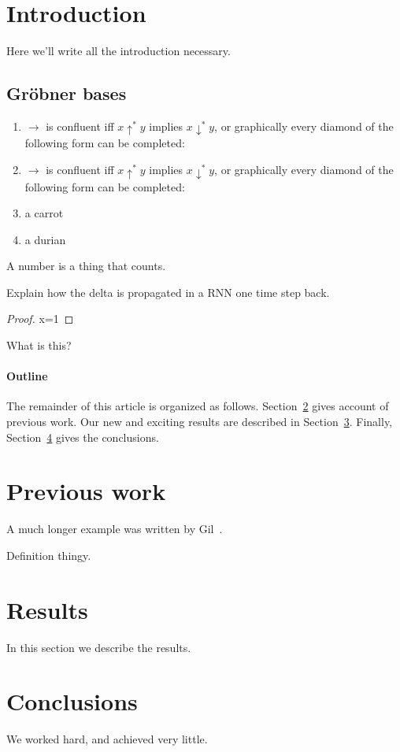\section{Introduction}
Here we'll write all the introduction necessary.

\subsection{Gr{\"o}bner bases}

\begin{definition} \leavevmode
	\begin{enumerate}[label=(\alph*)]
		\item $\rightarrow$ is confluent iff $x \uparrow^* y$ implies $x \downarrow^* y$, or graphically every diamond of the following form can be completed:
		\item $\rightarrow$ is confluent iff $x \uparrow^* y$ implies $x \downarrow^* y$, or graphically every diamond of the following form can be completed:
		\item a carrot
		\item a durian
	\end{enumerate}
\end{definition}

\begin{definition}
	A number is a thing that counts.
\end{definition}

\begin{theorem}
	Explain how the delta is propagated in a RNN one time step back.
\end{theorem}

\begin{proof}
	x=1
\end{proof}

\begin{theorem}
	What is this?
\end{theorem}

\paragraph{Outline}
The remainder of this article is organized as follows.
Section~\ref{previous work} gives account of previous work.
Our new and exciting results are described in Section~\ref{results}.
Finally, Section~\ref{conclusions} gives the conclusions.

\section{Previous work}\label{previous work}
A much longer \LaTeXe{} example was written by Gil~\cite{winkler1996}.

\begin{definition}
	Definition thingy.
\end{definition}

\section{Results}\label{results}
In this section we describe the results.

\section{Conclusions}\label{conclusions}
We worked hard, and achieved very little.